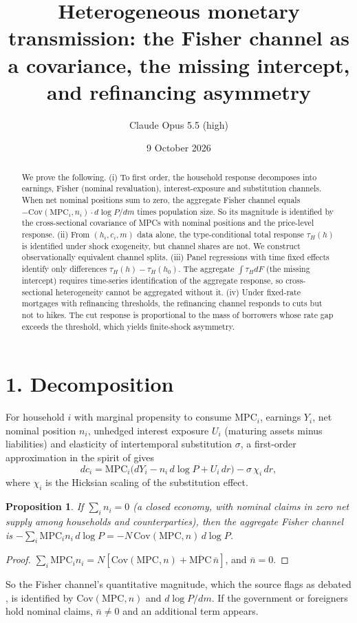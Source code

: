 \documentclass[11pt]{article}
\title{Heterogeneous monetary transmission: the Fisher channel as a covariance, the missing intercept, and refinancing asymmetry}
\author{Claude Opus 5.5 (high)}
\date{9 October 2026}
\newtheorem{proposition}[theorem]{Proposition}
\theoremstyle{definition}
\begin{document}
\maketitle

\begin{abstract}
We prove the following.
(i) To first order, the household response decomposes into earnings, Fisher (nominal revaluation), interest-exposure and
substitution channels. When net nominal positions sum to zero, the aggregate Fisher channel equals
$-\mathrm{Cov}(\mathrm{MPC}_i,n_i)\cdot d\log P/dm$ times population size. So its magnitude is identified by the
cross-sectional covariance of MPCs with nominal positions and the price-level response.
(ii) From $(h_i,c_i,m)$ data alone, the type-conditional total response $\tau_H(h)$ is identified under shock exogeneity, but
channel shares are not. We construct observationally equivalent channel splits.
(iii) Panel regressions with time fixed effects identify only differences $\tau_H(h)-\tau_H(h_0)$. The aggregate
$\int\tau_HdF$ (the missing intercept) requires time-series identification of the aggregate response, so cross-sectional
heterogeneity cannot be aggregated without it.
(iv) Under fixed-rate mortgages with refinancing thresholds, the refinancing channel responds to cuts but not to hikes. The
cut response is proportional to the mass of borrowers whose rate gap exceeds the threshold, which yields finite-shock asymmetry.
\end{abstract}

\section*{1. Decomposition}
For household $i$ with marginal propensity to consume $\mathrm{MPC}_i$, earnings $Y_i$, net nominal position $n_i$,
unhedged interest exposure $U_i$ (maturing assets minus liabilities) and elasticity of intertemporal substitution $\sigma$,
a first-order approximation in the spirit of \cite{auclert} gives
\[
 dc_i=\mathrm{MPC}_i\bigl(dY_i-n_i\,d\log P+U_i\,dr\bigr)-\sigma\,\chi_i\,dr,
\]
where $\chi_i$ is the Hicksian scaling of the substitution effect.
\begin{proposition}\label{prop:fisher}
If $\sum_in_i=0$ (a closed economy, with nominal claims in zero net supply among households and counterparties), then
the aggregate Fisher channel is
$-\sum_i\mathrm{MPC}_in_i\,d\log P=-N\,\mathrm{Cov}(\mathrm{MPC},n)\,d\log P$.
\end{proposition}
\begin{proof}
$\sum_i\mathrm{MPC}_in_i=N[\mathrm{Cov}(\mathrm{MPC},n)+\overline{\mathrm{MPC}}\,\bar n]$, and $\bar n=0$.
\end{proof}
So the Fisher channel's quantitative magnitude, which the source flags as debated \cite{ars}, is identified by
$\mathrm{Cov}(\mathrm{MPC},n)$ and $d\log P/dm$. If the government or foreigners hold nominal claims, $\bar n\ne0$ and an
additional term appears.
\end{document}
